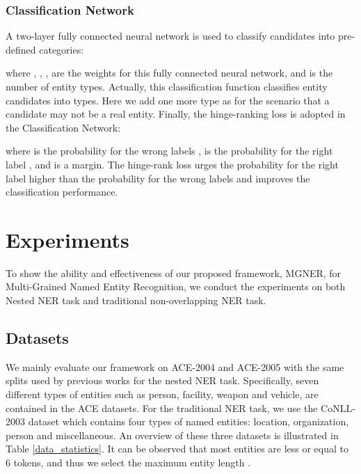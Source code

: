 \documentclass[11pt,a4paper]{article}
\newcommand{\ModelName}{\textsc{MGNER}}
\newcommand{\multi}{Multi-Grained}
\begin{document}
\subsubsection{Classification Network}
A two-layer fully connected neural network is used to classify candidates into pre-defined categories:

where ,  , ,  are the weights for this fully connected neural network, and  is the number of entity types. Actually, this classification function classifies entity candidates into  types. Here we add one more type as for the scenario that a candidate may not be a real entity.
Finally, the hinge-ranking loss is adopted in the Classification Network:

where  is the probability for the wrong labels ,  is the probability for the right label , and  is a margin.
The hinge-rank loss urges the probability for the right label higher than the probability for the wrong labels and improves the classification performance. \section{Experiments}
To show the ability and effectiveness of our proposed framework, {\ModelName}, for {\multi} Named Entity Recognition, we conduct the experiments on both Nested NER task and traditional non-overlapping NER task.

\subsection{Datasets}
We mainly evaluate our framework on ACE-2004 and ACE-2005 \cite{doddington2004automatic} with the same splits used by previous works \cite{luo2015joint, wang2018neural} for the nested NER task. Specifically, seven different types of entities such as person, facility, weapon and vehicle, are contained in the ACE datasets.
For the traditional NER task, we use the CoNLL-2003 dataset \cite{tjong2003introduction} which contains four types of named entities: location, organization, person and miscellaneous. 
An overview of these three datasets is illustrated in Table \ref{data_statistics}. It can be observed that most entities are less or equal to 6 tokens, and thus we select the maximum entity length .
\end{document}
